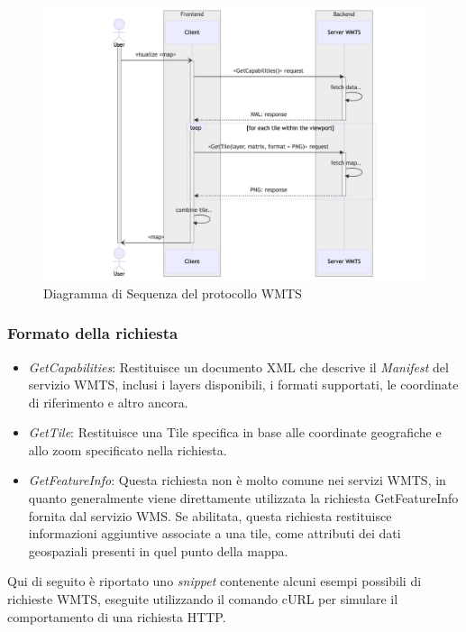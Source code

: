 \begin{figure}[htbp]
      \centering
      \includegraphics[width=1\textwidth]{images/Capitolo2/ProtocolWMTS.jpg}
      \caption{Diagramma di Sequenza del protocollo WMTS}
      \label{fig:wmts protocol}
\end{figure}

\subsubsection{Formato della richiesta}

\begin{itemize}
      \item \textit{GetCapabilities}: Restituisce un documento XML che descrive il \textit{Manifest} del servizio WMTS, inclusi i layers disponibili, i formati supportati, le coordinate di riferimento e altro ancora.
      \item \textit{GetTile}: Restituisce una Tile specifica in base alle coordinate geografiche e allo zoom specificato nella richiesta.
      \item \textit{GetFeatureInfo}: Questa richiesta non è molto comune nei servizi WMTS, in quanto generalmente viene direttamente utilizzata la richiesta GetFeatureInfo fornita dal servizio WMS. Se abilitata, questa richiesta restituisce informazioni aggiuntive associate a una tile, come attributi dei dati geospaziali presenti in quel punto della mappa.
\end{itemize}
Qui di seguito è riportato uno \textit{snippet} contenente alcuni esempi possibili di richieste WMTS, eseguite utilizzando il comando cURL per simulare il comportamento di una richiesta HTTP.

